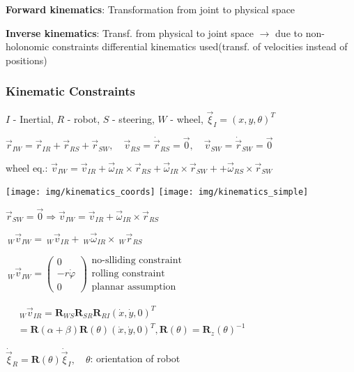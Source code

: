 \documentclass[fontsize=6pt]{scrartcl}
\newcommand{\mat}[1]{\mathbf{#1}}
\begin{document}
\begin{multicols*}{4}
\textbf{Forward kinematics}: Transformation from joint to physical space

\textbf{Inverse kinematics}: Transf. from physical to joint space
$\rightarrow$ due to non-holonomic constraints differential kinematics used(transf. of velocities instead of positions)

\subsubsection*{Kinematic Constraints}
$I$ - Inertial, $R$ - robot, $S$ - steering, $W$ - wheel, $\vec{\xi}_I = (x, y, \theta)^T$

$ \vec r_{IW} = \vec r_{IR} +\vec r_{RS} + \vec r_{SW},\quad \vec v_{RS} = \dot{\vec r}_{RS} = \vec{0}, \quad \vec v_{SW} = \dot{\vec r}_{SW} = \vec{0} $

wheel eq.: $ \vec v_{IW} = \vec v_{IR} + \vec{\omega}_{IR} \times \vec r_{RS} + \vec{\omega}_{IR} \times \vec r_{SW} + + \vec{\omega}_{RS} \times \vec r_{SW}$

\begin{minipage}{0.27\linewidth}
	\texttt{[image: img/kinematics\_coords]}
	\texttt{[image: img/kinematics\_simple]}
\end{minipage}
\begin{minipage}{0.73\linewidth}
$ \vec r_{SW} = \vec 0 \Rightarrow \vec v_{IW} = \vec v_{IR} + \vec{\omega}_{IR} \times \vec r_{RS}$

$ ~_W\vec v_{IW} = ~_W\vec v_{IR} + ~_W\vec{\omega}_{IR} \times ~_W\vec r_{RS}$

$ ~_W\vec v_{IW} = 
\begin{pmatrix}
0\\ -r\dot{\varphi}\\0
\end{pmatrix}
\begin{matrix}
\text{no-slliding constraint}\\
\text{rolling constraint}\\
\text{plannar assumption}
\end{matrix}
$

$
\begin{aligned}
 &~_W\vec v_{IR} = \mat R_{WS}  \mat R_{SR} \mat R_{RI} (\dot x, \dot y, 0)^T \\
 &= \mat R(\alpha + \beta) \mat R(\theta) (\dot x, \dot y, 0)^T, \mat R(\theta) = \mat R_z(\theta)^{-1}
\end{aligned}
$

$ \dot{\vec{\xi}}_R = \mat R(\theta) \dot{\vec{\xi}}_I, \quad \theta$: orientation of robot


\end{minipage}
\end{multicols*}
\end{document}
